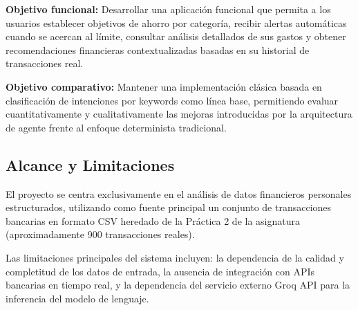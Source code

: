 \textbf{Objetivo funcional:} Desarrollar una aplicación funcional que permita a los usuarios establecer objetivos de ahorro por categoría, recibir alertas automáticas cuando se acercan al límite, consultar análisis detallados de sus gastos y obtener recomendaciones financieras contextualizadas basadas en su historial de transacciones real.

\textbf{Objetivo comparativo:} Mantener una implementación clásica basada en clasificación de intenciones por keywords como línea base, permitiendo evaluar cuantitativamente y cualitativamente las mejoras introducidas por la arquitectura de agente frente al enfoque determinista tradicional.

\subsection{Alcance y Limitaciones}
\label{subsec:alcance}

El proyecto se centra exclusivamente en el análisis de datos financieros personales estructurados, utilizando como fuente principal un conjunto de transacciones bancarias en formato CSV heredado de la Práctica 2 de la asignatura (aproximadamente 900 transacciones reales).

Las limitaciones principales del sistema incluyen: la dependencia de la calidad y completitud de los datos de entrada, la ausencia de integración con APIs bancarias en tiempo real, y la dependencia del servicio externo Groq API para la inferencia del modelo de lenguaje.